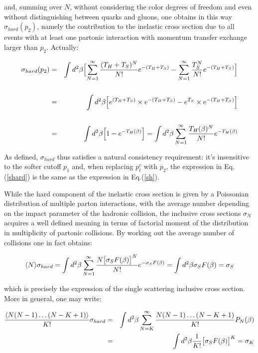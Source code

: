 \documentclass{ws-rv9x6}
\begin{document}
\noindent
and, summing over $N$, without considering the color degrees of freedom and even without distinguishing between quarks and gluons, one obtains in this way $\sigma_{hard}(p_2)$, namely the contribution to the inelastic cross
section due to all events with at least one partonic interaction
with momentum transfer exchange larger than $p_2$. Actually: 

\begin{eqnarray}
\sigma_{hard}(p_2)&=&\int d^2\beta\Bigl[\sum_{N=1}^{\infty}\frac{(T_H+T_S)^N}{N!}e^{-(T_H+T_S)}-\sum_{N=1}^{\infty}\frac{T_S^N}{N!}e^{-(T_H+T_S)}\Bigr]\cr
\cr
&=&\int d^2\beta\Bigl[e^{(T_H+T_S)}\times e^{-(T_H+T_S)}-e^{T_S}\times e^{-(T_H+T_S)}\Bigr]\cr
\cr
&=&\int d^2\beta\Bigl[1-e^{-T_H(\beta)}\Bigr]=\int d^2\beta\sum_{N=1}^{\infty}\frac{T_H(\beta)^N}{N!}e^{-T_H(\beta)}
\label{sh}
\end{eqnarray}


\noindent
As defined, $\sigma_{hard}$ thus satisfies a natural consistency requirement: it's insensitive to the softer cutoff $p_1$ and, when replacing $p_t^c$ with $p_2$, the expression in Eq.(\ref{shard}) is the same as the expression in Eq.(\ref{sh}). 

While the hard component of the inelastic cross section is given by a Poissonian distribution of multiple parton interactions, with the average number depending on the impact parameter of the hadronic collision, the inclusive cross sections $\sigma_N$ acquires a well defined meaning in terms of factorial moment of the distribution in multiplicity of partonic collisions. By working out the average number of
collisions one in fact obtains:

\begin{eqnarray}
\langle N\rangle\sigma_{hard}=\int d^2\beta\sum_{N=1}^{\infty}
{N\bigl[\sigma_SF(\beta)\bigr]^N\over N!}
 e^{-\sigma_SF(\beta)}=\int d^2\beta \sigma_SF(\beta)=\sigma_S\nonumber
\end{eqnarray}

\noindent which is precisely the expression of the single scattering inclusive cross section.
More in general, one may write:

\begin{eqnarray}
{\langle N(N-1)\dots(N-K+1)\rangle\over K!}\sigma_{hard}
&=&\int d^2\beta \sum_{N=K}^{\infty}
{N(N-1)\dots(N-K+1)\over K!}P_N(\beta)\nonumber\\
&=&\int d^2\beta {1\over K!}\bigl[\sigma_SF(\beta)\bigr]^K=\sigma_K
\end{eqnarray}
\end{document}
